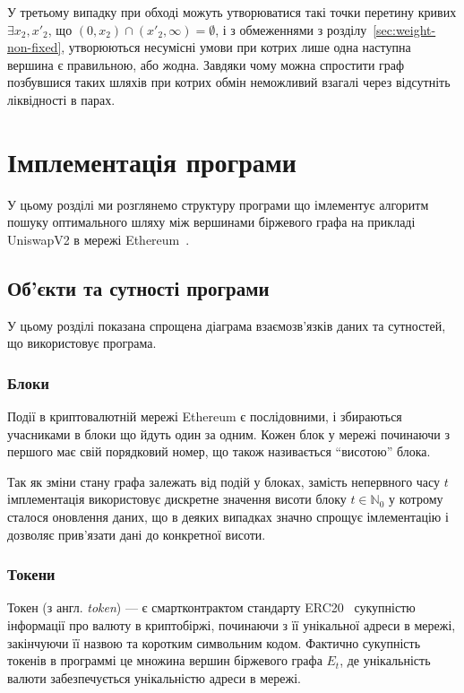 \documentclass[14pt]{extarticle}
\begin{document}
У третьому випадку при обході можуть утворюватися такі точки перетину кривих
$\exists x_{2}, x'_{2}$, що $\left(0, x_{2}\right) \cap{} \left(x'_{2}, \infty{} \right) = \emptyset$,
і з обмеженнями з розділу~\ref{sec:weight-non-fixed}, утворюються несумісні
умови при котрих лише одна наступна вершина є правильною, або жодна. Завдяки
чому можна спростити граф позбувшися таких шляхів при котрих обмін неможливий
взагалі через відсутніть ліквідності в парах.

\newpage

\section{Імплементація програми}

У цьому розділі ми розглянемо структуру програми що імлементує алгоритм пошуку
оптимального шляху між вершинами біржевого графа на прикладі UniswapV2 в мережі
Ethereum~\cite{ethereum}.

\subsection{Об'єкти та сутності програми}

У цьому розділі показана спрощена діаграма взаємозв'язків даних та сутностей, що
використовує програма.

\subsubsection{Блоки}

Події в криптовалютній мережі Ethereum є послідовними, і збираються учасниками в
блоки що йдуть один за одним. Кожен блок у мережі починаючи з першого має свій
порядковий номер, що також називається ``висотою'' блока.

Так як зміни стану графа залежать від подій у блоках, замість непервного часу
$t$ імплементація використовує дискретне значення висоти блоку $t \in \mathbb{N}_{0}$ у котрому
сталося оновлення даних, що в деяких випадках значно спрощує імлементацію і
дозволяє прив'язати дані до конкретної висоти.

\subsubsection{Токени}

Токен (з англ. \textit{token}) --- є смартконтрактом стандарту ERC20~\cite{erc20}
сукупністю інформації про валюту в криптобіржі, починаючи з її унікальної адреси
в мережі, закінчуючи її назвою та коротким символьним кодом. Фактично сукупність
токенів в программі це множина вершин біржевого графа $E_{t}$, де унікальність
валюти забезпечується унікальністю адреси в мережі.
\end{document}
